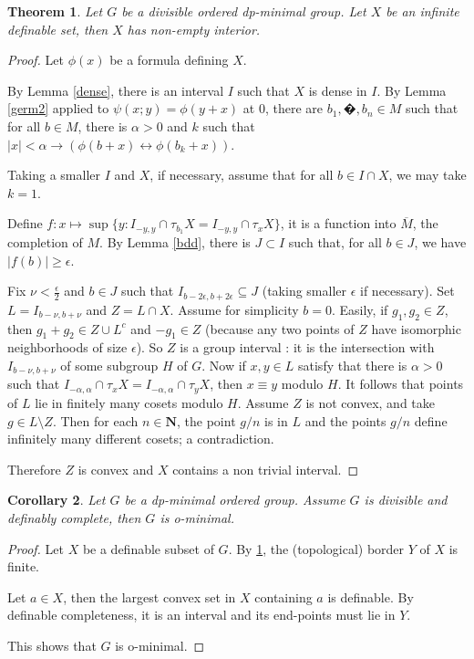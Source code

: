 \documentclass[english]{article}
\newtheorem{thm}{Theorem}[section]
\newtheorem{cor}[thm]{Corollary}
\theoremstyle{definition}
\theoremstyle{mystyle}
\theoremstyle{remark}
\begin{document}
\begin{thm}\label{interior}
Let $G$ be a divisible ordered dp-minimal group. Let $X$ be an infinite definable set, then $X$ has non-empty interior.
\end{thm}
\begin{proof}
Let $\phi(x)$ be a formula defining $X$.

By Lemma \ref{dense}, there is an interval $I$ such that $X$ is dense in $I$. By Lemma \ref{germ2} applied to $\psi(x;y)=\phi(y+x)$ at 0, there are $b_1,�,b_n \in M$ such that for all $b \in M$, there is $\alpha >0$ and $k$ such that $|x|<\alpha \rightarrow (\phi(b+x) \leftrightarrow \phi(b_k+x))$.

Taking a smaller $I$ and $X$, if necessary, assume that for all $b \in I \cap X$, we may take $k=1$.

Define $f : x \mapsto \sup \{y : I_{-y,y} \cap \tau_{b_1} X = I_{-y,y} \cap\tau_x X\}$, it is a function into $\overline M$, the completion of $M$. By Lemma \ref{bdd}, there is $J \subset I$ such that, for all $b \in J$, we have $|f(b)|\geq \epsilon$.


Fix $\nu < \frac \epsilon 2$ and $b \in J$ such that $I_{b-2\epsilon,b+2\epsilon} \subseteq J$ (taking smaller $\epsilon$ if necessary). Set $L = I_{b-\nu,b+\nu}$ and $Z = L \cap X$. Assume for simplicity $b=0$. Easily, if $g_1,g_2 \in Z$, then $g_1+g_2 \in Z \cup L^c$ and $-g_1 \in Z$ (because any two points of $Z$ have isomorphic neighborhoods of size $\epsilon$). So $Z$ is a group interval : it is the intersection with $I_{b-\nu,b+\nu}$ of some subgroup $H$ of $G$. Now if $x,y \in L$ satisfy that there is $\alpha >0$ such that $I_{-\alpha,\alpha}\cap \tau_x X = I_{-\alpha,\alpha} \cap \tau_y X$, then $x\equiv y$ modulo $H$. It follows that points of $L$ lie in finitely many cosets modulo $H$. Assume $Z$ is not convex, and take $g \in  L \setminus Z$. Then for each $n \in \mathbf N$, the point $g/n$ is in $L$ and the points $g/n$ define infinitely many different cosets; a contradiction.

Therefore $Z$ is convex and $X$ contains a non trivial interval.
\end{proof}

\begin{cor}
Let $G$ be a dp-minimal ordered group. Assume $G$ is divisible and definably complete, then $G$ is o-minimal.
\end{cor}
\begin{proof}
Let $X$ be a definable subset of $G$. By \ref{interior}, the (topological) border $Y$ of $X$ is finite.

Let $a \in X$, then the largest convex set in $X$ containing $a$ is definable. By definable completeness, it is an interval and its end-points must lie in $Y$.

This shows that $G$ is o-minimal.
\end{proof}
\end{document}
